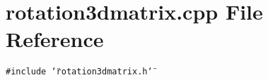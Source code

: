 \section{rotation3dmatrix.cpp File Reference}
\label{rotation3dmatrix_8cpp}
{\tt \#include \char`\"{}rotation3dmatrix.h\char`\"{}}\par

